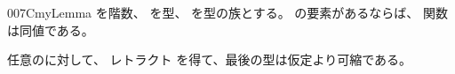 \documentclass[index]{subfiles}
\begin{document}
\begin{myBlock}{007C}{myLemma}
  を階数、
  を型、
  を型の族とする。
  の要素があるならば、
  関数は同値である。
\end{myBlock}
\StartDefiningTabulars
\begin{myProof}
  任意のに対して、
  レトラクト
  を得て、最後の型は仮定より可縮である。
\end{myProof}
\StopDefiningTabulars
\end{document}
